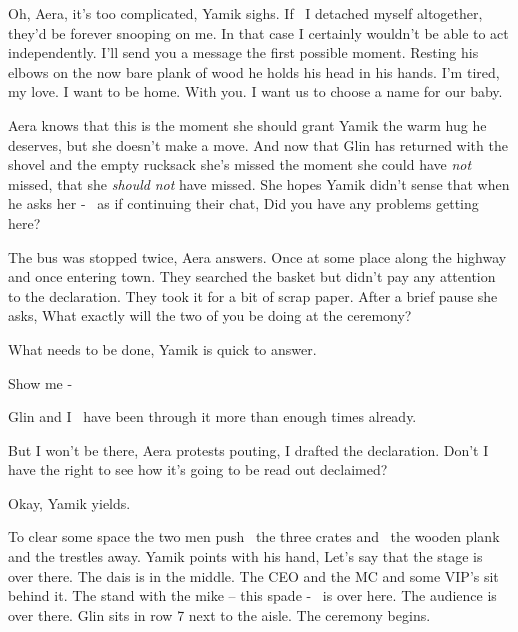 \documentclass[letterpaper]{article}
\begin{document}
{\textquotedbl}Oh, Aera, it's too complicated,{\textquotedbl} Yamik sighs. {\textquotedbl}If \ I detached myself
altogether, they'd be forever snooping on{ }me. In that case I certainly wouldn't be able to act
independently. I'll send you a message the first possible moment.{\textquotedbl} Resting his elbows on the now bare
plank of wood he holds his head in his hands. {\textquotedbl}I'm tired, my love. I want to be home. With you. I want
us{ }to choose a name for our baby.{\textquotedbl} 

Aera knows that this is the moment she should grant Yamik the warm hug he deserves, but she doesn't make a move. And now
that Glin has returned with the shovel and the empty rucksack she's missed the moment she could have \textit{not}
missed, that she \textit{should} \textit{not} have missed. She hopes Yamik didn't sense that when he asks her - \ as if
continuing their chat, {\textquotedbl}Did you have any problems getting here?{\textquotedbl} 

{\textquotedbl}The bus was stopped twice,{\textquotedbl} Aera answers. {\textquotedbl}Once at some place along the
highway and once entering town. They searched the basket but didn't pay any attention to the declaration. They took it
for a bit of scrap paper.{\textquotedbl} After a brief pause she asks, {\textquotedbl}What exactly will the two of you
be doing at the ceremony?{\textquotedbl} 

{\textquotedbl}What needs to be done,{\textquotedbl} Yamik is quick to answer. 

{\textquotedbl}Show me -{\textquotedbl} 

{\textquotedbl}Glin and I~ have been through it more than enough times already.{\textquotedbl} 

{\textquotedbl}But I won't be there,{\textquotedbl} Aera protests pouting, {\textquotedbl}I drafted the declaration.
Don't I have the right to see how it's going to be read out declaimed?{\textquotedbl} 

{\textquotedbl}Okay,{\textquotedbl} Yamik yields.

To clear some space the two men push \ the three crates and \ the wooden plank and the trestles
away{.} Yamik points with his hand, {\textquotedbl}Let's say that the stage is
over there. The dais is in the middle. The CEO and the MC and some VIP's sit behind it. The stand with the mike -- this
spade - ~is over here. The audience is over there. Glin sits in row 7 next to the aisle. The ceremony
begins.{\textquotedbl} 
\end{document}
